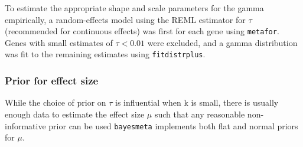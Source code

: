 To estimate the appropriate shape and scale parameters for the gamma empirically, a random-effects model using the \gls{REML} estimator for $\tau$ (recommended for continuous effects\autocite{veroniki2016MethodsEstimateBetweenstudy}) was first for each gene using \texttt{metafor}.
Genes with small estimates of $\tau < 0.01$ were excluded, and a gamma distribution was fit to the remaining estimates using \texttt{fitdistrplus}.

\subsubsection{Prior for effect size}

While the choice of prior on $\tau$ is influential when k is small, there is usually enough data to estimate the effect size $\mu$ such that any reasonable non-informative prior can be used \autocite{gelman2006PriorDistributionsVariance,friede2017MetaanalysisFewSmall} 
\texttt{bayesmeta} implements both flat and normal priors for $\mu$.


